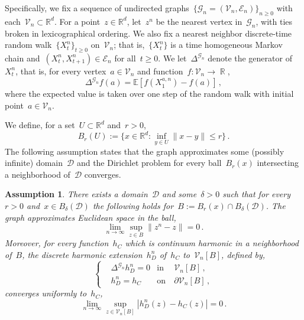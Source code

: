 \documentclass[12pt]{amsart}
\numberwithin{equation}{section}
\DeclareMathOperator{\R}{\mathbb{R}}
\newtheorem{assumptionD}{Assumption}
\newcommand*{\Rd}{\ensuremath{\mathbb{R}^d}}
\newcommand{\G}{\mathcal{G}}
\newcommand{\V}{\mathcal{V}}
\newcommand{\E}{\mathcal{E}}
\begin{document}
Specifically, we fix a sequence of undirected graphs~$\{\G_n = (\V_n, \E_n)\}_{n\geq0}$
with each~$\V_n \subset \Rd$.  For a point~$z \in \Rd$, let~$z^{n}$ be the nearest vertex in~$\G_n$, with ties broken in lexicographical ordering.  
We also fix a nearest neighbor discrete-time random walk~$\{X_t^{n}\}_{t \geq 0}$ on~$\V_n$; that is,~$\{X_t^{n}\}$ is a time homogeneous Markov chain and~$(X_{t}^{n}, X_{t+1}^{n}) \in \E_n$ for all~$t \geq 0$. We let~$\Delta^{\G_n}$ denote the generator of~$X_t^{n}$, that is,
for every vertex~$a \in \V_n$ and function~$f: \V_n \to \R$, 
\[
\Delta^{\G_n} f(a) = \mathbb{E}[f(X^{a, n}_1) - f(a)] \, , 
\]
where the expected value is taken over one step of the random walk with initial point~$a \in \V_n$. 



 We define, for a set~$U \subset \Rd$ and~$r > 0$, 
\[
B_{r}(U) := \{ x \in \Rd : \inf_{y \in U}\| x - y\| \leq r\} \, . 
\]
 The following assumption states that the graph approximates some (possibly infinite) domain~$\mathcal{D}$ and the Dirichlet problem for every ball~$B_r(x)$ intersecting a neighborhood of~$\mathcal{D}$ converges. 
 
\begin{assumptionD}
	\label{ass:D}
	{There exists a domain~$\mathcal{D}$ and some~$\delta > 0$ such that for every~$r > 0$ and~$x \in B_{\delta}(\mathcal{D})$ the following holds for~$B := B_r(x) \cap B_{\delta}(\mathcal{D})$.} The graph approximates Euclidean space in the ball, 
	\begin{equation}
		\label{eq:local-approximation-of-space}
	\lim_{n \to \infty} \sup_{z \in B} \| z^{n} - z\| = 0 \, . 
	\end{equation}
	Moreover, for every function~$h_C$ which is continuum harmonic in a neighborhood of~$B$, the discrete
	harmonic extension~$h^{n}_D$ of~$h_C$ to~$\V_n[B]$, defined by, 
	\[
	\left\{
	\begin{aligned}
		&  \Delta^{\G_n} h^{n}_D = 0 & \mbox{in} & \ \V_n[B] \,,
		\\
		& h^{n}_D = h_C & \mbox{on} &  \ \partial \V_n[B]    \, ,
	\end{aligned}
	\right.
	\]
	converges uniformly to~$h_C$,
	\begin{equation}
		\label{eq:convergence-of-d-problem}
	\lim_{n \to \infty} \sup_{z \in \V_n[B]} |h^{n}_D(z) - h_C(z)|  = 0 \, . 
	\end{equation}
\end{assumptionD}
\end{document}
